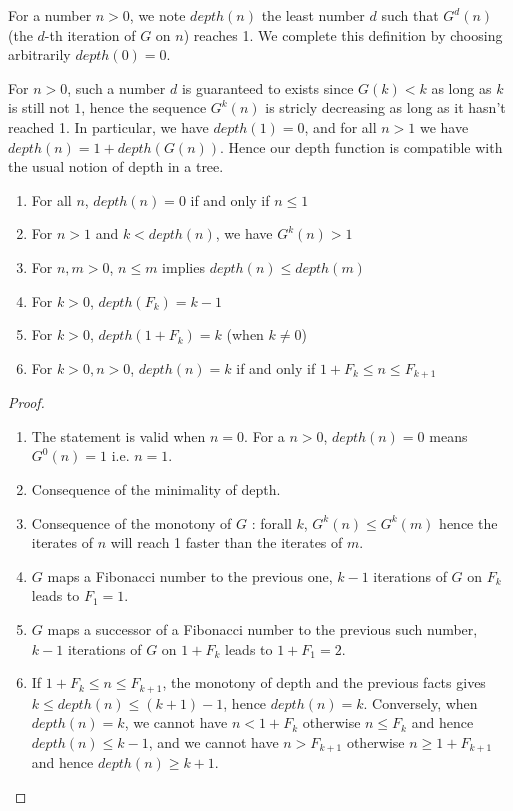 \documentclass[a4paper,11pt]{article}
\begin{document}
\begin{definition}
For a number $n>0$, we note $depth(n)$ the least number $d$ such that
$G^d(n)$ (the $d$-th iteration of $G$ on $n$) reaches 1.
We complete this definition by choosing arbitrarily $depth(0)=0$.
\end{definition}

For $n>0$, such a number $d$ is guaranteed to exists since $G(k)<k$ as long as
$k$ is still not $1$, hence the sequence $G^k(n)$ is stricly
decreasing as long as it hasn't reached 1.
In particular, we have $depth(1)=0$, and for all $n>1$ we have
$depth(n) = 1+depth(G(n))$. Hence our depth function is compatible
with the usual notion of depth in a tree.

\begin{theorem}\label{depthprops}
\noindent
\begin{enumerate}
\item For all $n$, $depth(n)=0$ if and only if $n\le 1$
\item For $n>1$ and $k<depth(n)$, we have $G^k(n) > 1$
\item For $n,m>0$, $n\le m$ implies $depth(n)\le depth(m)$
\item For $k>0$, $depth(F_k) = k-1$
\item For $k>0$, $depth(1+F_k) = k$ (when $k\neq 0$)
\item For $k>0,n>0$, $depth(n)=k$ if and only if $1+F_k \leq n \leq
  F_{k+1}$
\end{enumerate}
\end{theorem}
\begin{proof}
\noindent
\begin{enumerate}
\item The statement is valid when $n=0$. For a $n>0$, 
$depth(n)=0$ means $G^0(n)=1$ i.e. $n=1$.
\item Consequence of the minimality of depth.
\item Consequence of the monotony of $G$ :
  forall $k$, $G^k(n)\le G^k(m)$ hence the iterates of $n$ will reach
  1 faster than the iterates of $m$.
\item $G$ maps a Fibonacci number to the previous one, $k-1$
  iterations of $G$ on $F_k$ leads to $F_1=1$.
\item $G$ maps a successor of a Fibonacci number to the previous such
  number, $k-1$ iterations of $G$ on $1+F_k$ leads to $1+F_1 = 2$.
\item If $1+F_k \leq n \leq F_{k+1}$, the monotony of depth and the
previous facts gives $k \le depth(n) \le (k+1)-1$, hence $depth(n)=k$.
Conversely, when $depth(n)=k$, we cannot have $n < 1 + F_k$ otherwise
$n \le F_k$ and hence $depth(n)\le k-1$, and we cannot have $n > F_{k+1}$
otherwise $n \ge 1+F_{k+1}$ and hence $depth(n)\ge k+1$.
\end{enumerate}
\end{proof}
\end{document}
